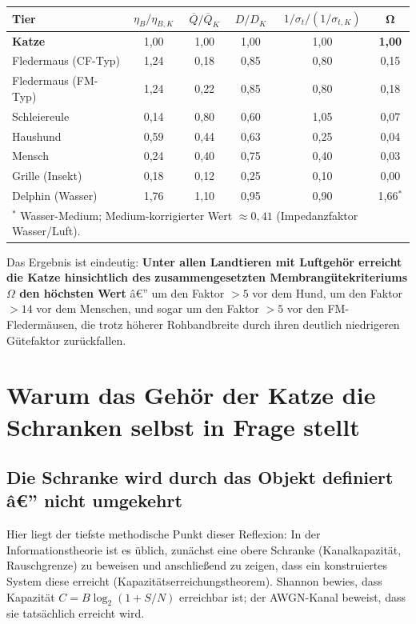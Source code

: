 ﻿\documentclass[12pt,a4paper,titlepage]{report}
\begin{document}
\begin{center}
\renewcommand{\arraystretch}{1.45}
\begin{tabular}{lccccc}
\toprule
\textbf{Tier} & $\eta_B / \eta_{B,K}$ & $\overline{Q}/\overline{Q}_K$ &
$D/D_K$ & $1/\sigma_t / (1/\sigma_{t,K})$ & $\mathbf{\Omega}$ \\
\midrule
\textbf{Katze}        & 1{,}00 & 1{,}00 & 1{,}00 & 1{,}00 & \textbf{1{,}00} \\
Fledermaus (CF-Typ)   & 1{,}24 & 0{,}18 & 0{,}85 & 0{,}80 & 0{,}15 \\
Fledermaus (FM-Typ)   & 1{,}24 & 0{,}22 & 0{,}85 & 0{,}80 & 0{,}18 \\
Schleiereule          & 0{,}14 & 0{,}80 & 0{,}60 & 1{,}05 & 0{,}07 \\
Haushund              & 0{,}59 & 0{,}44 & 0{,}63 & 0{,}25 & 0{,}04 \\
Mensch                & 0{,}24 & 0{,}40 & 0{,}75 & 0{,}40 & 0{,}03 \\
Grille (Insekt)       & 0{,}18 & 0{,}12 & 0{,}25 & 0{,}10 & 0{,}00 \\
Delphin (Wasser)      & 1{,}76 & 1{,}10 & 0{,}95 & 0{,}90 & 1{,}66$^*$ \\
\bottomrule
\multicolumn{6}{l}{\footnotesize $^*$ Wasser-Medium; Medium-korrigierter Wert $\approx 0{,}41$ (Impedanzfaktor Wasser/Luft).}
\end{tabular}
\end{center}

Das Ergebnis ist eindeutig:
\textbf{Unter allen Landtieren mit Luftgehör erreicht die Katze hinsichtlich des
zusammengesetzten Membrangütekriteriums $\Omega$ den höchsten Wert} â€” um den
Faktor $> 5$ vor dem Hund, um den Faktor $> 14$ vor dem Menschen, und sogar
um den Faktor $> 5$ vor den FM-Fledermäusen, die trotz höherer Rohbandbreite durch
ihren deutlich niedrigeren Gütefaktor zurückfallen.

\section{Warum das Gehör der Katze die Schranken selbst in Frage stellt}

\subsection{Die Schranke wird durch das Objekt definiert â€” nicht umgekehrt}

Hier liegt der tiefste methodische Punkt dieser Reflexion:
In der Informationstheorie ist es üblich, zunächst eine obere Schranke
(Kanalkapazität, Rauschgrenze) zu beweisen und anschließend zu zeigen,
dass ein konstruiertes System diese erreicht (Kapazitätserreichungstheorem).
Shannon bewies, dass Kapazität $C = B\log_2(1 + S/N)$ erreichbar ist;
der AWGN-Kanal beweist, dass sie tatsächlich erreicht wird.
\end{document}
